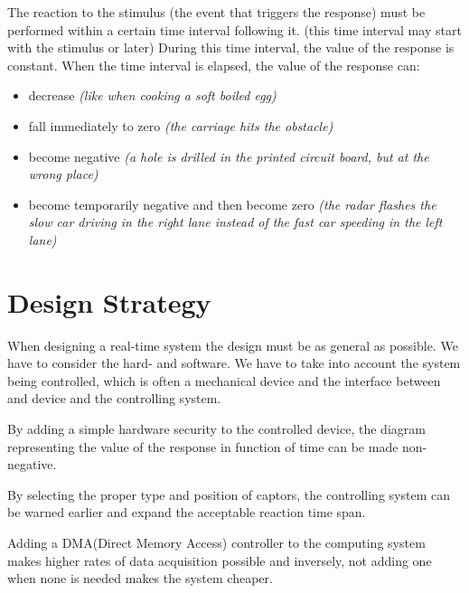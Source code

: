 \documentclass[../main.tex]{subfiles}
\begin{document}

The reaction to the stimulus (the event that triggers the response) must be performed within a certain time interval following it. (this time interval may start with the stimulus or later) During this time interval, the value of the response is constant. When the time interval is elapsed, the value of the response can:
\begin{itemize}
	\item decrease \textit{(like when cooking a soft boiled egg)}
	\item fall immediately to zero \textit{(the carriage hits the obstacle)}
	\item become negative \textit{(a hole is drilled in the printed circuit board, but at the wrong place)}
	\item become temporarily negative and then become zero\textit{ (the radar flashes the slow car driving in the right lane instead of the fast car speeding in the left lane)}
\end{itemize}

\section{Design Strategy}
When designing a real-time system the design must be as general as possible. We have to consider the hard- and software. We have to take into account the system being controlled, which is often a mechanical device and the interface between and device and the controlling system.

\begin{exmp}
By adding a simple hardware security to the controlled device, the diagram representing the value of the response in function of time can be made non-negative.
\end{exmp}

\begin{exmp}
By selecting the proper type and position of captors, the controlling system can be warned earlier and expand the acceptable reaction time span.
\end{exmp}

\begin{exmp}
Adding a DMA(Direct Memory Access) controller to the computing system makes higher rates of data acquisition possible and inversely, not adding one when none is needed makes the system cheaper.
\end{exmp}
\end{document}
